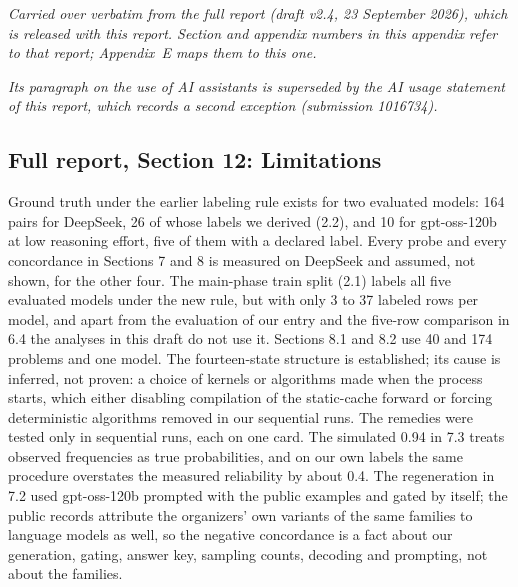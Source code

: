 \emph{Carried over verbatim from the full report (draft v2.4, 23 September 2026), which is released with this report. Section and appendix numbers in this appendix refer to that report; Appendix~E maps them to this one.}

\emph{Its paragraph on the use of AI assistants is superseded by the AI usage statement of this report, which records a second exception (submission 1016734).}

\subsection*{Full report, Section 12: Limitations}

Ground truth under the earlier labeling rule exists for two evaluated models: 164 pairs for DeepSeek, 26 of whose labels we derived (2.2), and 10 for gpt-oss-120b at low reasoning effort, five of them with a declared label. Every probe and every concordance in Sections 7 and 8 is measured on DeepSeek and assumed, not shown, for the other four. The main-phase train split (2.1) labels all five evaluated models under the new rule, but with only 3 to 37 labeled rows per model, and apart from the evaluation of our entry and the five-row comparison in 6.4 the analyses in this draft do not use it. Sections 8.1 and 8.2 use 40 and 174 problems and one model. The fourteen-state structure is established; its cause is inferred, not proven: a choice of kernels or algorithms made when the process starts, which either disabling compilation of the static-cache forward or forcing deterministic algorithms removed in our sequential runs. The remedies were tested only in sequential runs, each on one card. The simulated 0.94 in 7.3 treats observed frequencies as true probabilities, and on our own labels the same procedure overstates the measured reliability by about 0.4. The regeneration in 7.2 used gpt-oss-120b prompted with the public examples and gated by itself; the public records attribute the organizers' own variants of the same families to language models as well, so the negative concordance is a fact about our generation, gating, answer key, sampling counts, decoding and prompting, not about the families.

